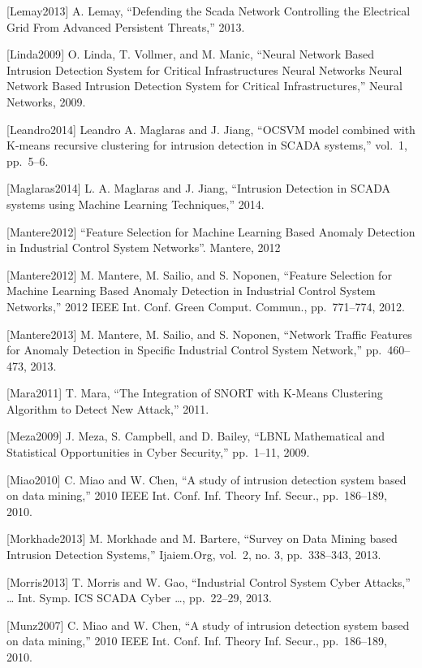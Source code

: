 \documentclass[12pt,]{article}
\begin{document}
{[}Lemay2013{]} A. Lemay, ``Defending the Scada Network Controlling the
Electrical Grid From Advanced Persistent Threats,'' 2013.

{[}Linda2009{]} O. Linda, T. Vollmer, and M. Manic, ``Neural Network
Based Intrusion Detection System for Critical Infrastructures Neural
Networks Neural Network Based Intrusion Detection System for Critical
Infrastructures,'' Neural Networks, 2009.

{[}Leandro2014{]} Leandro A. Maglaras and J. Jiang, ``OCSVM model
combined with K-means recursive clustering for intrusion detection in
SCADA systems,'' vol.~1, pp.~5--6.

{[}Maglaras2014{]} L. A. Maglaras and J. Jiang, ``Intrusion Detection in
SCADA systems using Machine Learning Techniques,'' 2014.

{[}Mantere2012{]} ``Feature Selection for Machine Learning Based Anomaly
Detection in Industrial Control System Networks''. Mantere, 2012

{[}Mantere2012{]} M. Mantere, M. Sailio, and S. Noponen, ``Feature
Selection for Machine Learning Based Anomaly Detection in Industrial
Control System Networks,'' 2012 IEEE Int. Conf. Green Comput. Commun.,
pp.~771--774, 2012.

{[}Mantere2013{]} M. Mantere, M. Sailio, and S. Noponen, ``Network
Traffic Features for Anomaly Detection in Specific Industrial Control
System Network,'' pp.~460--473, 2013.

{[}Mara2011{]} T. Mara, ``The Integration of SNORT with K-Means
Clustering Algorithm to Detect New Attack,'' 2011.

{[}Meza2009{]} J. Meza, S. Campbell, and D. Bailey, ``LBNL Mathematical
and Statistical Opportunities in Cyber Security,'' pp.~1--11, 2009.

{[}Miao2010{]} C. Miao and W. Chen, ``A study of intrusion detection
system based on data mining,'' 2010 IEEE Int. Conf. Inf. Theory Inf.
Secur., pp.~186--189, 2010.

{[}Morkhade2013{]} M. Morkhade and M. Bartere, ``Survey on Data Mining
based Intrusion Detection Systems,'' Ijaiem.Org, vol.~2, no. 3,
pp.~338--343, 2013.

{[}Morris2013{]} T. Morris and W. Gao, ``Industrial Control System Cyber
Attacks,'' \ldots{} Int. Symp. ICS SCADA Cyber \ldots{}, pp.~22--29,
2013.

{[}Munz2007{]} C. Miao and W. Chen, ``A study of intrusion detection
system based on data mining,'' 2010 IEEE Int. Conf. Inf. Theory Inf.
Secur., pp.~186--189, 2010.
\end{document}
